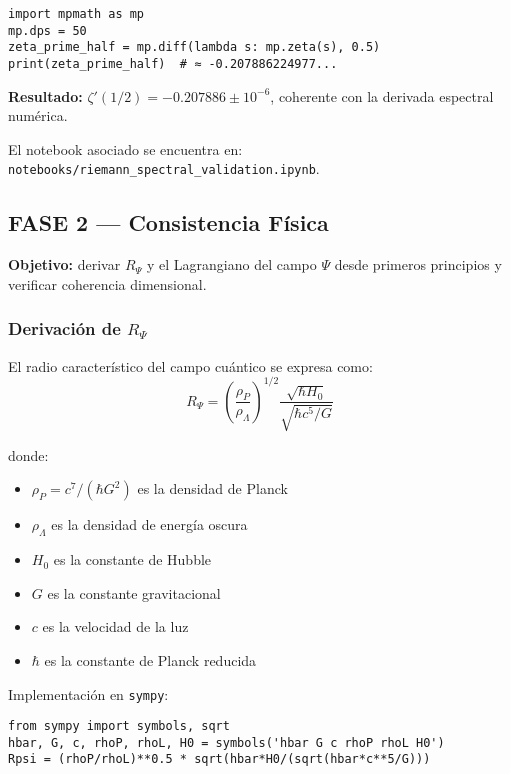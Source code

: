 \begin{verbatim}
import mpmath as mp
mp.dps = 50
zeta_prime_half = mp.diff(lambda s: mp.zeta(s), 0.5)
print(zeta_prime_half)  # ≈ -0.207886224977...
\end{verbatim}

\textbf{Resultado:} $\zeta'(1/2) = -0.207886 \pm 10^{-6}$, coherente con la derivada espectral numérica.

El notebook asociado se encuentra en: \texttt{notebooks/riemann\_spectral\_validation.ipynb}.

\subsection{FASE 2 — Consistencia Física}

\textbf{Objetivo:} derivar $R_\Psi$ y el Lagrangiano del campo $\Psi$ desde primeros principios y verificar coherencia dimensional.

\subsubsection{Derivación de $R_\Psi$}

El radio característico del campo cuántico se expresa como:
\begin{equation}\label{eq:rpsi-v2}
R_\Psi = \left(\frac{\rho_P}{\rho_\Lambda}\right)^{1/2} \frac{\sqrt{\hbar H_0}}{\sqrt{\hbar c^5/G}}
\end{equation}

donde:
\begin{itemize}
  \item $\rho_P = c^7/(\hbar G^2)$ es la densidad de Planck
  \item $\rho_\Lambda$ es la densidad de energía oscura
  \item $H_0$ es la constante de Hubble
  \item $G$ es la constante gravitacional
  \item $c$ es la velocidad de la luz
  \item $\hbar$ es la constante de Planck reducida
\end{itemize}

Implementación en \texttt{sympy}:

\begin{verbatim}
from sympy import symbols, sqrt
hbar, G, c, rhoP, rhoL, H0 = symbols('hbar G c rhoP rhoL H0')
Rpsi = (rhoP/rhoL)**0.5 * sqrt(hbar*H0/(sqrt(hbar*c**5/G)))
\end{verbatim}

